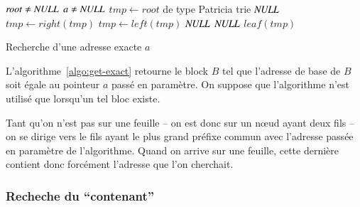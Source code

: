 \begin{algorithm}
\begin{algorithmic}
\Require $\mathit{root} \neq \mathit{NULL}$
\Require $a \neq \mathit{NULL}$
\State $\mathit{tmp} \gets \mathit{root}$ de type Patricia trie
    \Return $\mathit{NULL}$
  \EndIf
    \State $\mathit{tmp} \gets \mathit{right(tmp)}$
    \State $\mathit{tmp} \gets \mathit{left(tmp)}$
  \Else
    \Return $\mathit{NULL}$
  \EndIf
\EndWhile
{}
  \Return $\mathit{NULL}$
\Else
  \Return $\mathit{leaf(tmp)}$
\EndIf
\end{algorithmic}
\caption{Recherche d'une adresse exacte $a$
  \label{algo:get-exact}}
\end{algorithm}

L'algorithme~\ref{algo:get-exact} retourne le block $B$ tel que l'adresse de
base de $B$ soit égale au pointeur $a$ passé en paramètre.
On suppose que l'algorithme n'est utilisé que lorsqu'un tel bloc existe.

Tant qu'on n'est pas sur une feuille -- on est donc sur un n\oe{}ud ayant deux
fils -- on se dirige vers le fils ayant le plus grand préfixe commun avec
l'adresse passée en paramètre de l'algorithme.
Quand on arrive sur une feuille, cette dernière contient donc forcément
l'adresse que l'on cherchait.

\subsubsection*{Recheche du ``contenant''}

